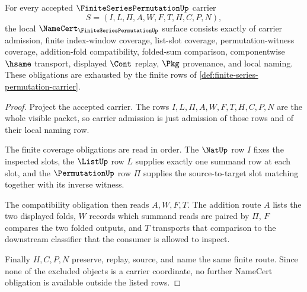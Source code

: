\begin{theorem}
\label{thm:finite-series-permutation-namecert-obligations}
For every accepted $\FiniteSeriesPermutationUp$ carrier
$$
S=(I,L,\Pi,A,W,F,T,H,C,P,N),
$$
the local $\NameCert_{\FiniteSeriesPermutationUp}$ surface consists exactly of carrier admission, finite index-window coverage, list-slot coverage, permutation-witness coverage, addition-fold compatibility, folded-sum comparison, componentwise $\hsame$ transport, displayed $\Cont$ replay, $\Pkg$ provenance, and local naming. These obligations are exhausted by the finite rows of \autoref{def:finite-series-permutation-carrier}.
\end{theorem}
\begin{proof}
Project the accepted carrier. The rows $I,L,\Pi,A,W,F,T,H,C,P,N$ are the whole visible packet, so carrier admission is just admission of those rows and of their local naming row.

The finite coverage obligations are read in order. The $\NatUp$ row $I$ fixes the inspected slots, the $\ListUp$ row $L$ supplies exactly one summand row at each slot, and the $\PermutationUp$ row $\Pi$ supplies the source-to-target slot matching together with its inverse witness.

The compatibility obligation then reads $A,W,F,T$. The addition route $A$ lists the two displayed folds, $W$ records which summand reads are paired by $\Pi$, $F$ compares the two folded outputs, and $T$ transports that comparison to the downstream classifier that the consumer is allowed to inspect.

Finally $H,C,P,N$ preserve, replay, source, and name the same finite route. Since none of the excluded objects is a carrier coordinate, no further NameCert obligation is available outside the listed rows.
\end{proof}

